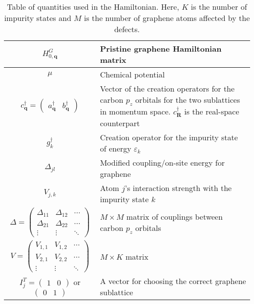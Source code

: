 \documentclass[aps,prb,superscriptaddress,preprint,floatfix]{revtex4-1}
\begin{document}
%
\begin{table*}
  \centering
\begin{tabular}{ |c|m{10cm}| } 
 \hline
$H_{0,\mathbf{q}}^G$ & Pristine graphene Hamiltonian matrix
 \\
 \hline
$\mu$ & Chemical potential
\\ 
 \hline 
 $c^\dagger_{\mathbf{q}} = \begin{pmatrix} a^\dagger_{\mathbf{q}}&b^\dagger_{\mathbf{q}}\end{pmatrix}$ & Vector of the creation operators for the carbon $p_z$ orbitals for the two sublattices in momentum space. $c^\dagger_{\mathbf{R}}$ is the real-space counterpart
 \\ 
 \hline 
 $g^\dagger_k$ & Creation operator for the impurity state of energy $\varepsilon_k$
 \\
 \hline
 $\Delta_{jl}$ & Modified coupling/on-site energy for graphene
 \\ 
 \hline 
 $V_{j,k}$ & Atom $j$'s interaction strength with the impurity state $k$
 \\
\hline 
 $\Delta
 = \begin{pmatrix}
 	\Delta_{11} & \Delta_{12}& \cdots
 	\\
 	\Delta_{21} & \Delta_{22}& \cdots
 	\\
 	\vdots & \vdots & \ddots
 \end{pmatrix}$ & $M\times M$ matrix of couplings between carbon $p_z$ orbitals  \\ 
 \hline 
 $V= \begin{pmatrix}
 	V_{1,1} & V_{1,2}& \cdots
 	\\
 	V_{2,1} & V_{2,2}& \cdots
 	\\
 	\vdots & \vdots & \ddots
 \end{pmatrix}$ & $M\times K$ matrix
\\ 
 \hline
  $I_j^T = \begin{pmatrix} 1 & 0 \end{pmatrix}$ or $ \begin{pmatrix} 0 & 1 \end{pmatrix}$ & A vector for choosing the correct graphene sublattice
   \\
 \hline
\end{tabular}
  \caption{Table of quantities used in the Hamiltonian. Here, $K$ is the number of impurity states and $M$ is the number of graphene atoms affected by the defects.}
  \label{tab:Reference}
\end{table*}
%
\end{document}
